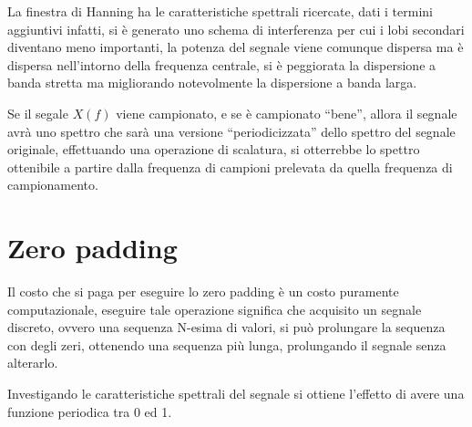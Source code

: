 La finestra di Hanning ha le caratteristiche spettrali ricercate, dati i
termini aggiuntivi infatti, si è generato uno schema di interferenza per cui i
lobi secondari diventano meno importanti, la potenza del segnale viene comunque
dispersa ma è dispersa nell'intorno della frequenza centrale, si è peggiorata
la dispersione a banda stretta ma migliorando notevolmente la dispersione a
banda larga.




Se il segale $X(f)$ viene campionato, e se è campionato ``bene'', allora il
segnale avrà uno spettro che sarà una versione ``periodicizzata'' dello spettro
del segnale originale, effettuando una operazione di scalatura, si otterrebbe
lo spettro ottenibile a partire dalla frequenza di campioni prelevata  da
quella frequenza di campionamento.





\section{Zero padding}
Il costo che si paga per eseguire lo zero padding è un costo puramente
computazionale, eseguire tale operazione significa che acquisito un segnale
discreto, ovvero una sequenza N-esima di valori, si può prolungare la sequenza
con degli zeri, ottenendo una sequenza più lunga, prolungando il segnale senza
alterarlo.

Investigando le caratteristiche spettrali del segnale si ottiene l'effetto di
avere una funzione periodica tra 0 ed 1.





